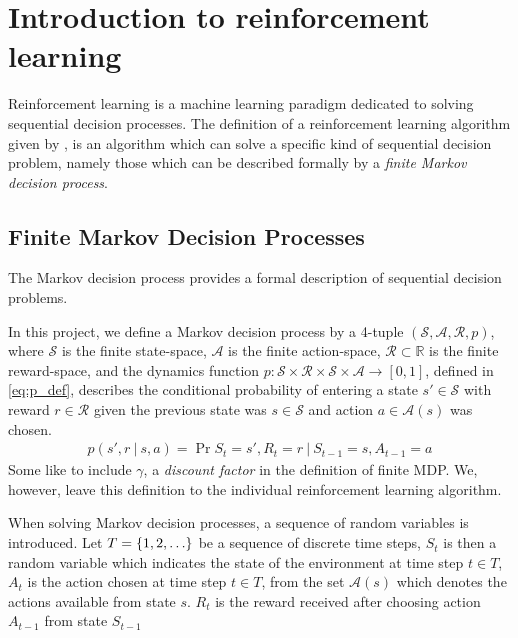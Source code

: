 \section{Introduction to reinforcement learning}
Reinforcement learning is a machine learning paradigm dedicated to solving sequential decision processes. The definition of a reinforcement learning algorithm given by \citet[chap. 3]{RLBook2018}, is an algorithm which can solve a specific kind of sequential decision problem, namely those which can be described formally by a \textit{finite Markov decision process}.


\subsection{Finite Markov Decision Processes}

The Markov decision process provides a formal description of sequential decision problems. 

In this project, we define a Markov decision process by a 4-tuple $(\mathcal{S},\mathcal{A},\mathcal{R}, p)$, where $\mathcal{S}$ is the finite state-space, $\mathcal{A}$ is the finite action-space, $\mathcal{R} \subset \mathbb{R}$ is the finite reward-space, and the dynamics function $p : \mathcal{S} \times \mathcal{R} \times \mathcal{S} \times \mathcal{A} \rightarrow [0,1]$, defined in \cref{eq:p_def}, describes the conditional probability of entering a state $s' \in \mathcal{S}$ with reward $r \in \mathcal{R}$ given the previous state was $s \in \mathcal{S}$ and action $a \in \mathcal{A}(s)$ was chosen.
\begin{align}
    \label{eq:p_def} p(s',r\ |\ s,a) = \Pr{S_t\!=\!s', R_t\!=\!r\ |\ S_{t-1}\!=\!s, A_{t-1}\!=\!a}
\end{align}
Some like to include $\gamma$, a \textit{discount factor} in the definition of finite MDP. 
We, however, leave this definition to the individual reinforcement learning algorithm.


\vspace*{1em}

When solving Markov decision processes, a sequence of random variables is introduced. Let $T = \left\{1, 2, \ldots\right\}$ be a sequence of discrete time steps, $S_t$ is then a random variable which indicates the state of the environment at time step $t \in T$, $A_t$ is the action chosen at time step $t \in T$, from the set $\mathcal{A}(s)$ which denotes the actions available from state $s$. 
$R_t$ is the reward received after choosing action $A_{t-1}$ from state $S_{t-1}$

